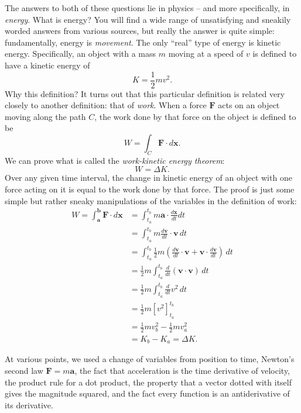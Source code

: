 \documentclass{myarticle}
\renewcommand{\vec}[1]{\mathbf{#1}}
\theoremstyle{nospace}
\newtheorem{old series theorem}{Theorem}
\newenvironment{series theorem}
{\begin{mdframed}\begin{old series theorem}}
    {\end{old series theorem}\end{mdframed}}
\begin{document}
The answers to both of these questions lie in physics -- and more
specifically, in \textit{energy}. What is energy? You will find a wide
range of unsatisfying and sneakily worded answers from various
sources, but really the answer is quite simple: fundamentally, energy
is \textit{movement}. The only ``real'' type of energy is kinetic
energy. Specifically, an object with a mass $m$ moving at a speed of
$v$ is defined to have a kinetic energy of
\[
  K = \frac{1}{2}mv^2.
\]
Why this definition? It turns out that this particular definition is
related very closely to another definition: that of \textit{work}.
When a force $\vec{F}$ acts on an object moving along the path $C$,
the work done by that force on the object is defined to be
\[
  W = \int_C \vec{F} \cdot d\vec{x}.
\]
We can prove what is called the \textit{work-kinetic energy theorem}:
\[
  W = \Delta K.
\]
Over any given time interval, the change in kinetic energy of an
object with one force acting on it is equal to the work done by that
force. The proof is just some simple but rather sneaky manipulations
of the variables in the definition of work:
\begin{align*}
  W = \int_\vec{a}^\vec{b} \vec{F} \cdot d\vec{x}
  &= \int_{t_a}^{t_b} m\vec{a} \cdot \frac{d\vec{x}}{dt} dt \\
  &= \int_{t_a}^{t_b} m\frac{d\vec{v}}{dt} \cdot \vec{v} \,dt \\
  &= \int_{t_a}^{t_b} \frac{1}{2}m\left(\frac{d\vec{v}}{dt}
    \cdot \vec{v} + \vec{v} \cdot \frac{d\vec{v}}{dt}\right) \,dt \\
  &= \frac{1}{2}m \int_{t_a}^{t_b} \frac{d}{dt} \left(\vec{v}
    \cdot \vec{v}\right) \,dt \\
  &= \frac{1}{2}m \int_{t_a}^{t_b} \frac{d}{dt} v^2 \,dt \\
  &= \frac{1}{2}m \left[v^2\right]_{t_a}^{t_b} \\
  &= \frac{1}{2}mv_b^2 - \frac{1}{2}mv_a^2 \\
  &= K_b - K_a = \Delta K.
\end{align*}

At various points, we used a change of variables from position to
time, Newton's second law $\vec{F} = m\vec{a}$, the fact that
acceleration is the time derivative of velocity, the product rule for
a dot product, the property that a vector dotted with itself gives the
magnitude squared, and the fact every function is an antiderivative of
its derivative.
\end{document}
